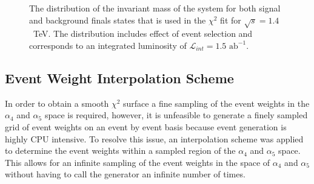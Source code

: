 \begin{figure}[h!]
\centering
{}
\caption[The distribution of the invariant mass of the system for both signal and background finals states that is used in the $\chi^{2}$ fit for $\sqrt{s}=1.4$~TeV.  The distribution includes effect of event selection and corresponds to an integrated luminosity of $\mathcal{L}_{int} = 1.5\text{ ab}^{-1}$.]{The distribution of the invariant mass of the system for both signal and background finals states that is used in the $\chi^{2}$ fit for $\sqrt{s}=1.4$~TeV.  The distribution includes effect of event selection and corresponds to an integrated luminosity of $\mathcal{L}_{int} = 1.5\text{ ab}^{-1}$.}
\label{fig:signalbackgroundfit}
\end{figure}


\subsection{Event Weight Interpolation Scheme}
\label{sec:eventweightsinterpolation}
In order to obtain a smooth $\chi^{2}$ surface a fine sampling of the event weights in the $\alpha_{4}$ and $\alpha_{5}$ space is required, however, it is unfeasible to generate a finely sampled grid of event weights on an event by event basis because event generation is highly CPU intensive.  To resolve this issue, an interpolation scheme was applied to determine the event weights within a sampled region of the $\alpha_{4}$ and $\alpha_{5}$ space.  This allows for an infinite sampling of the event weights in the space of $\alpha_{4}$ and $\alpha_{5}$ without having to call the generator an infinite number of times.

